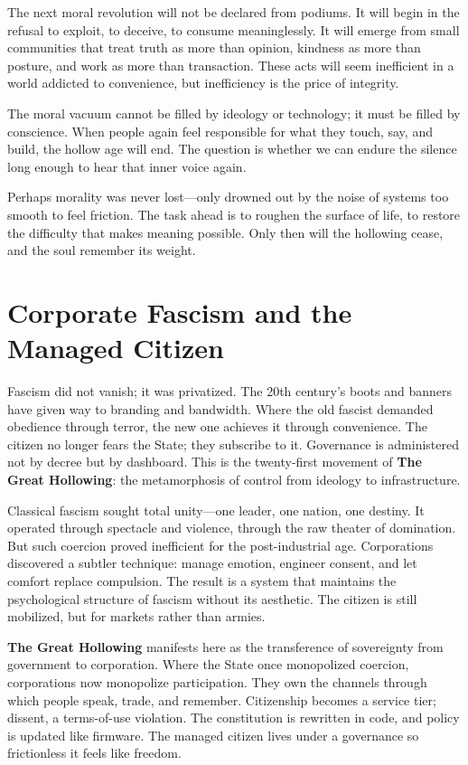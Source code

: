 \documentclass[11pt,twoside]{book}
\begin{document}
The next moral revolution will not be declared from podiums.  It will begin in the refusal to exploit, to deceive, to consume meaninglessly.  It will emerge from small communities that treat truth as more than opinion, kindness as more than posture, and work as more than transaction.  These acts will seem inefficient in a world addicted to convenience, but inefficiency is the price of integrity.

The moral vacuum cannot be filled by ideology or technology; it must be filled by conscience.  When people again feel responsible for what they touch, say, and build, the hollow age will end.  The question is whether we can endure the silence long enough to hear that inner voice again.

Perhaps morality was never lost—only drowned out by the noise of systems too smooth to feel friction.  The task ahead is to roughen the surface of life, to restore the difficulty that makes meaning possible.  Only then will the hollowing cease, and the soul remember its weight.

%
\chapter{Corporate Fascism and the Managed Citizen}
\label{ch:23}

Fascism did not vanish; it was privatized.  
The 20th century’s boots and banners have given way to branding and bandwidth.  Where the old fascist demanded obedience through terror, the new one achieves it through convenience.  The citizen no longer fears the State; they subscribe to it.  Governance is administered not by decree but by dashboard.  This is the twenty-first movement of \textbf{The Great Hollowing}: the metamorphosis of control from ideology to infrastructure.

Classical fascism sought total unity—one leader, one nation, one destiny.  It operated through spectacle and violence, through the raw theater of domination.  But such coercion proved inefficient for the post-industrial age.  Corporations discovered a subtler technique: manage emotion, engineer consent, and let comfort replace compulsion.  The result is a system that maintains the psychological structure of fascism without its aesthetic.  The citizen is still mobilized, but for markets rather than armies.

\textbf{The Great Hollowing} manifests here as the transference of sovereignty from government to corporation.  Where the State once monopolized coercion, corporations now monopolize participation.  They own the channels through which people speak, trade, and remember.  Citizenship becomes a service tier; dissent, a terms-of-use violation.  The constitution is rewritten in code, and policy is updated like firmware.  The managed citizen lives under a governance so frictionless it feels like freedom.
\end{document}
